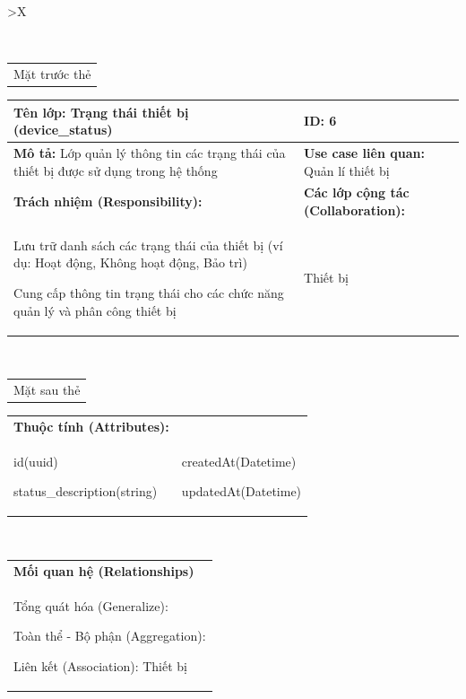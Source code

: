 \begin{xltabular}{\textwidth}{
		>{\centering\arraybackslash}X
	}
	\caption{\bfseries \fontsize{12pt}{0pt}\selectfont Thẻ CRC lớp Trạng thái thiết bị}
	\\
	\begin{tabularx}{0.9\textwidth}{X}
		Mặt trước thẻ
	\end{tabularx}
	\begin{tabularx}{0.9\textwidth}{|X|X|}
		\hline
		\textbf{Tên lớp:} Trạng thái thiết bị (device\_status)                                        & \textbf{ID:} 6                                 \\
		\hline
		\textbf{Mô tả:} Lớp quản lý thông tin các trạng thái của thiết bị được sử dụng trong hệ thống & \textbf{Use case liên quan:}  Quản lí thiết bị \\
		\hline
		\textbf{Trách nhiệm (Responsibility):}                                                        & \textbf{Các lớp cộng tác (Collaboration):}     \\
		Lưu trữ danh sách các trạng thái của thiết bị (ví dụ: Hoạt động, Không hoạt động, Bảo trì)

		Cung cấp thông tin trạng thái cho các chức năng quản lý và phân công thiết bị
		                                                                                              &
		Thiết bị
		\\
		\hline
	\end{tabularx}
	\\
	\begin{tabularx}{0.9\textwidth}{X}
		Mặt sau thẻ
	\end{tabularx}
	\begin{tabularx}{0.9\textwidth}{|X|X|}
		\hline
		\textbf{Thuộc tính (Attributes):} & \\
		id(uuid)

		status\_description(string)
		                                  &
		createdAt(Datetime)

		updatedAt(Datetime)
		\\ \hline
	\end{tabularx}
	\\
	\begin{tabularx}{0.9\textwidth}{|X|}
		\hline
		\textbf{Mối quan hệ (Relationships)} \\
		Tổng quát hóa (Generalize):

		Toàn thể - Bộ phận (Aggregation):

		Liên kết (Association): Thiết bị
		\\
		\hline
	\end{tabularx}
\end{xltabular}

